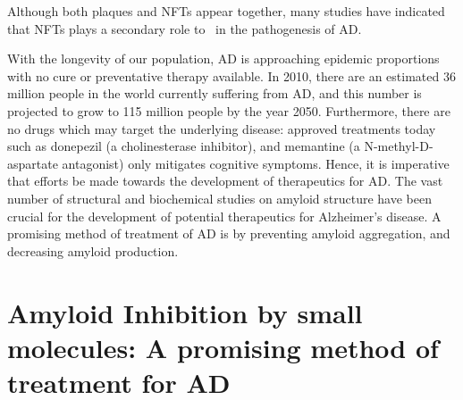 Although both plaques and NFTs appear together, many studies have indicated that NFTs plays a secondary role to \abeta\ in the pathogenesis of AD.\cite{XXX} %

With the longevity of our population, AD is approaching epidemic proportions with no cure or preventative therapy available.\cite{Blennow:2006wd} In 2010, there are an estimated 36 million people in the world currently suffering from AD, and this number is projected to grow to 115 million people by the year 2050.\cite{alzreport:2012}  Furthermore, there are no drugs which may target the underlying disease: approved treatments today such as donepezil (a cholinesterase inhibitor), and memantine (a N-methyl-D-aspartate antagonist) only mitigates cognitive symptoms. Hence, it is imperative that efforts be made towards the development of therapeutics for AD.  The vast number of structural and biochemical studies on amyloid structure have been crucial for the development of potential therapeutics for Alzheimer's disease.  A promising method of treatment of AD is by preventing amyloid aggregation, and decreasing amyloid production.


\section{Amyloid Inhibition by small molecules: A promising method of treatment for AD}

